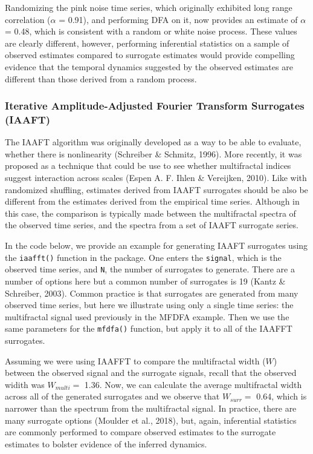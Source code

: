 \documentclass[
  man]{apa6}
\begin{document}
Randomizing the pink noise time series, which originally exhibited long
range correlation (\(\alpha\) = 0.91), and performing DFA on
it, now provides an estimate of \(\alpha\) = 0.48,
which is consistent with a random or white noise process. These values
are clearly different, however, performing inferential statistics on a
sample of observed estimates compared to surrogate estimates would
provide compelling evidence that the temporal dynamics suggested by the
observed estimates are different than those derived from a random
process.

\hypertarget{iterative-amplitude-adjusted-fourier-transform-surrogates-iaaft}{%
\subsubsection{Iterative Amplitude-Adjusted Fourier Transform Surrogates (IAAFT)}\label{iterative-amplitude-adjusted-fourier-transform-surrogates-iaaft}}

The IAAFT algorithm was originally developed as a way to be able to
evaluate, whether there is nonlinearity (Schreiber \& Schmitz, 1996). More recently,
it was proposed as a technique that could be use to see whether
multifractal indices suggest interaction across scales (Espen A. F. Ihlen \& Vereijken, 2010).
Like with randomized shuffling, estimates derived from IAAFT surrogates
should be also be different from the estimates derived from the
empirical time series. Although in this case, the comparison is
typically made between the multifractal spectra of the observed time
series, and the spectra from a set of IAAFT surrogate series.

In the code below, we provide an example for generating IAAFT surrogates
using the \texttt{iaafft()} function in the package. One enters the \texttt{signal},
which is the observed time series, and \texttt{N}, the number of surrogates to
generate. There are a number of options here but a common number of
surrogates is 19 (Kantz \& Schreiber, 2003). Common practice is that surrogates are
generated from many observed time series, but here we illustrate using
only a single time series: the multifractal signal used previously in
the MFDFA example. Then we use the same parameters for the \texttt{mfdfa()}
function, but apply it to all of the IAAFFT surrogates.

Assuming we were using IAAFFT to compare the multifractal width (\(W\))
between the observed signal and the surrogate signals, recall that the
observed widith was \(W_{multi} =\)
1.36. Now, we can
calculate the average multifractal width across all of the generated
surrogates and we observe that \(W_{surr} =\) 0.64, which is
narrower than the spectrum from the multifractal signal. In practice,
there are many surrogate options (Moulder et al., 2018), but, again, inferential
statistics are commonly performed to compare observed estimates to the
surrogate estimates to bolster evidence of the inferred dynamics.
\end{document}

